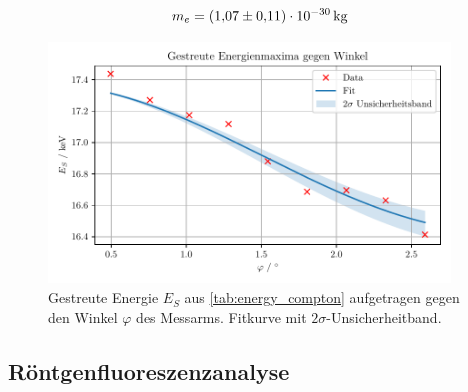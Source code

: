 \documentclass[ngerman]{scrartcl}
\begin{document}
\[m_e = \SI{1.07(11)E-30}{\kilogram}\]
%
\begin{figure}[H]
    \centering
    \begin{samepage}
        \includegraphics[width=0.95\textwidth]{../plots/energie_winkel.pdf}
        \caption[Gestreute Energie $E_S$ gegen Winkel $\varphi$]{Gestreute Energie $E_S$ aus \autoref{tab:energy_compton} aufgetragen gegen den Winkel $\varphi$ des Messarms. Fitkurve mit $2\sigma$-Unsicherheitband.}
        \label{fig:compton_energy}
    \end{samepage}
\end{figure}


\subsection{Röntgenfluoreszenzanalyse}
\label{subsec:auswertung_fluoreszenz}
\end{document}
